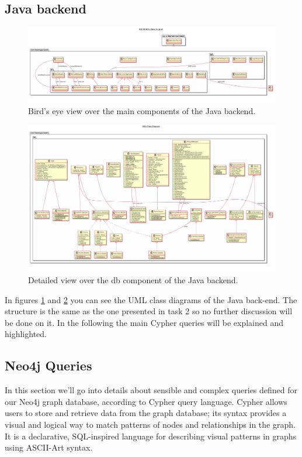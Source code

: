\documentclass[11pt]{article}
\begin{document}
\subsection{Java backend}
\begin{figure}[]
    \centering
    \includegraphics[width=\textheight,angle=90]{figs/backend.pdf}
    \caption{Bird's eye view over the main components of the Java backend.}
    \label{fig:uml-backend}
\end{figure}
\begin{figure}[]
    \centering
    \includegraphics[width=\textheight,angle=90]{figs/db.pdf}
    \caption{Detailed view over the db component of the Java backend.}
    \label{fig:uml-db}
\end{figure}

In figures \ref{fig:uml-backend} and \ref{fig:uml-db} you can see the UML class
diagrams of the Java back-end. The structure is the same as the one presented 
in task 2 so no further discussion will be done on it. In the following the 
main Cypher queries will be explained and highlighted.


\subsection{Neo4j Queries}
In this section we'll go into details about sensible and complex queries defined for our Neo4j graph database, according to Cypher query language. Cypher allows users to store and retrieve data from the graph database; its syntax provides a visual and logical way to match patterns of nodes and relationships in the graph. It is a declarative, SQL-inspired language for describing visual patterns in graphs using ASCII-Art syntax.
\end{document}
